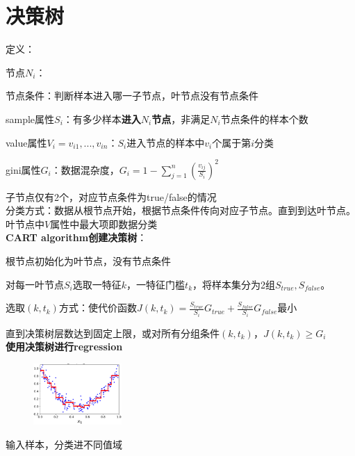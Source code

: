 \documentclass[UTF8]{ctexart}
\begin{document}
\section{决策树}
\noindent 定义：

  节点$N_i$：

  \quad 节点条件：判断样本进入哪一子节点，叶节点没有节点条件
  
  \quad sample属性$S_i$：有多少样本\textbf{进入$N_i$节点}，非满足$N_i$节点条件的样本个数

  \quad value属性$V_i = v_{i1}, ..., v_{in}$：$S_i$进入节点的样本中$v_i$个属于第$i$分类

  \quad gini属性$G_i$：数据混杂度，$G_i = 1-\sum_{j=1}^{n}(\frac{v_{ij}}{S_i})^2$
  
  \quad 子节点仅有2个，对应节点条件为true/false的情况\\
分类方式：数据从根节点开始，根据节点条件传向对应子节点。直到到达叶节点。叶节点中$V$属性中最大项即数据分类\\
\textbf{CART algorithm创建决策树}：

  根节点初始化为叶节点，没有节点条件
  
  对每一叶节点$S_i$选取一特征$k$，一特征门槛$t_k$，将样本集分为2组$S_{true}, S_{false}$。
  
  \quad 选取$(k, t_k)$方式：使代价函数$J(k, t_k) = \frac{S_{true}}{S_i}G_{true} + \frac{S_{false}}{S_i}G_{false}$最小

  直到决策树层数达到固定上限，或对所有分组条件$(k, t_k)$，$J(k, t_k) \geq G_i$\\
\textbf{使用决策树进行regression}

  \begin{figure}[H] %
    \centering %
    \includegraphics[width=0.3\textwidth]{note_images/deci_tree_regression.png} %
  \end{figure}

  输入样本，分类进不同值域
\end{document}
